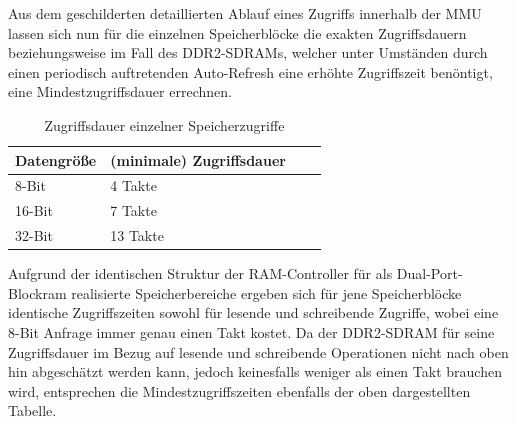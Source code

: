 
Aus dem geschilderten detaillierten Ablauf eines Zugriffs innerhalb der MMU lassen sich nun f\"ur die einzelnen Speicherbl\"ocke die exakten Zugriffsdauern beziehungsweise im Fall des DDR2-SDRAMs, welcher unter Umst\"anden durch einen periodisch auftretenden Auto-Refresh eine erh\"ohte Zugriffszeit ben\"ontigt, eine Mindestzugriffsdauer errechnen.

\begin{table}[H]
\begin{center}
	\begin{tabular}{| l | l | l | l |}
		\hline
		Datengr\"o\ss{}e & (minimale) Zugriffsdauer \\ \hline
		8-Bit & 4 Takte \\ \hline 
		16-Bit & 7 Takte \\ \hline
		32-Bit & 13 Takte \\ \hline
	\end{tabular}
\end{center}
\caption{Zugriffsdauer einzelner Speicherzugriffe}
\end{table}

Aufgrund der identischen Struktur der RAM-Controller f\"ur als Dual-Port-Blockram realisierte Speicherbereiche ergeben sich f\"ur jene Speicherbl\"ocke identische Zugriffszeiten sowohl f\"ur lesende und schreibende Zugriffe, wobei eine 8-Bit Anfrage immer genau einen Takt kostet. Da der DDR2-SDRAM f\"ur seine Zugriffsdauer im Bezug auf lesende und schreibende Operationen nicht nach oben hin abgesch\"atzt werden kann, jedoch keinesfalls weniger als einen Takt brauchen wird, entsprechen die Mindestzugriffszeiten ebenfalls der oben dargestellten Tabelle.


